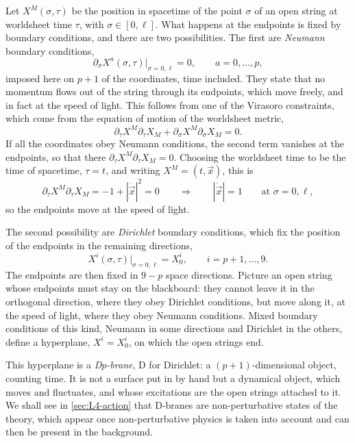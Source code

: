 Let $X^M(\sigma,\tau)$ be the position in spacetime of the point $\sigma$ of an open string at worldsheet time $\tau$, with $\sigma\in[0,\ell]$. What happens at the endpoints is fixed by boundary conditions, and there are two possibilities. The first are \emph{Neumann} boundary conditions,
\begin{equation}
  \partial_\sigma X^a(\sigma,\tau)\big|_{\sigma=0,\ell} = 0 ,\qquad a = 0,\dots,p ,
  \label{eq:L4-neumann}
\end{equation}
imposed here on $p+1$ of the coordinates, time included. They state that no momentum flows out of the string through its endpoints, which move freely, and in fact at the speed of light.
This follows from one of the Virasoro constraints, which come from the equation of motion of the worldsheet metric,
\begin{equation}
  \partial_\tau X^M\partial_\tau X_M + \partial_\sigma X^M\partial_\sigma X_M = 0 .
  \label{eq:L4-virasoro}
\end{equation}
If all the coordinates obey Neumann conditions, the second term vanishes at the endpoints, so that there $\partial_\tau X^M\partial_\tau X_M = 0$. Choosing the worldsheet time to be the time of spacetime, $\tau = t$, and writing $X^M = (t,\vec x)$, this is
\begin{equation}
  \partial_\tau X^M\partial_\tau X_M = -1 + |\dot{\vec x}|^2 = 0
  \qquad\Longrightarrow\qquad |\dot{\vec x}| = 1
  \qquad\text{at } \sigma = 0,\ell ,
  \label{eq:L4-speed}
\end{equation}
so the endpoints move at the speed of light.

The second possibility are \emph{Dirichlet} boundary conditions, which fix the position of the endpoints in the remaining directions,
\begin{equation}
  X^i(\sigma,\tau)\big|_{\sigma=0,\ell} = X^i_0 ,\qquad i = p+1,\dots,9 .
  \label{eq:L4-dirichlet}
\end{equation}
The endpoints are then fixed in $9-p$ space directions.
Picture an open string whose endpoints must stay on the blackboard: they cannot leave it in the orthogonal direction, where they obey Dirichlet conditions, but move along it, at the speed of light, where they obey Neumann conditions. Mixed boundary conditions of this kind, Neumann in some directions and Dirichlet in the others, define a hyperplane, $X^i = X^i_0$, on which the open strings end.

This hyperplane is a \emph{D$p$-brane}, D for Dirichlet: a $(p+1)$-dimensional object, counting time. It is not a surface put in by hand but a dynamical object, which moves and fluctuates, and whose excitations are the open strings attached to it. We shall see in \cref{sec:L4-action} that D-branes are non-perturbative states of the theory, which appear once non-perturbative physics is taken into account and can then be present in the background.

